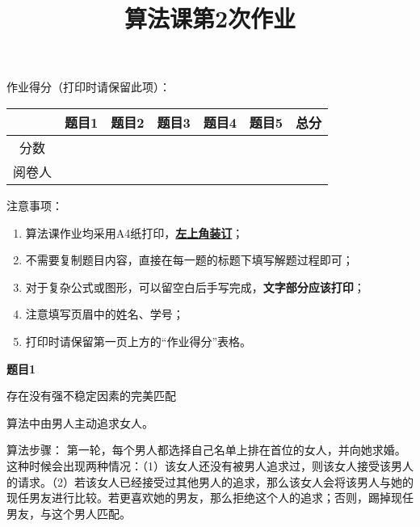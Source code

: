 \documentclass[a4paper,11pt,UTF8]{ctexart}
\title{算法课第2次作业}
\author{}
\date{}
\begin{document}
\begin{spacing}{1.2}
\setlength{\parsep}{0.9ex}

\maketitle

\setlength{\parindent}{0em}

作业得分（打印时请保留此项）：

\thispagestyle{fancy}
\fancyhf{}
\rhead{}
\lfoot{}
\cfoot{}
\rfoot{\thepage / \pageref{LastPage}}


\begin{table}[!htb]
\centering
\begin{tabular}{|c|c|c|c|c|c|c|}
\hline
 & 题目1 & 题目2 & 题目3 & 题目4 & 题目5 & 总分\\
\hline
\multirow{2}{*}{分数} &  &   &  &  &  &  \\
 &  &   &  &  &  &  \\
\hline
\multirow{2}{*}{阅卷人}  &  &   &  &  &  &  \\
 &  &   &  &  &  &  \\
\hline
\end{tabular}
\end{table}

注意事项：
\begin{enumerate}[itemindent=2em]
\footnotesize
  \item 算法课作业均采用A4纸打印，\underline{\textbf{左上角装订}}；
  \item 不需要复制题目内容，直接在每一题的标题下填写解题过程即可；
  \item 对于复杂公式或图形，可以留空白后手写完成，\textbf{文字部分应该打印}；
  \item 注意填写页眉中的姓名、学号；
  \item 打印时请保留第一页上方的“作业得分”表格。
\end{enumerate}


\textbf{\large{题目1}}
\setlength{\parindent}{2em}

存在没有强不稳定因素的完美匹配

 算法中由男人主动追求女人。

算法步骤：
第一轮，每个男人都选择自己名单上排在首位的女人，并向她求婚。这种时候会出现两种情况：（1）该女人还没有被男人追求过，则该女人接受该男人的请求。（2）若该女人已经接受过其他男人的追求，那么该女人会将该男人与她的现任男友进行比较。若更喜欢她的男友，那么拒绝这个人的追求；否则，踢掉现任男友，与这个男人匹配。


\end{spacing}
\end{document}
